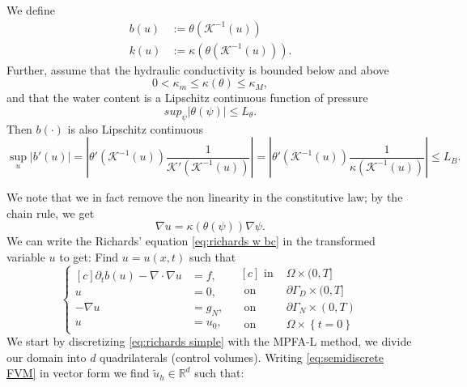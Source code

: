 \documentclass[../Main/main.tex]{subfiles}
\begin{document}
	We define
	\begin{equation}
		\begin{aligned}
			b(u) &:= \theta(\mathcal{K}^{-1}(u))\\
			k(u) &:= \kappa (\theta (\mathcal{K}^{-1}(u))).
		\end{aligned}
	\end{equation}
	Further, assume that the hydraulic conductivity is bounded below and above
	\begin{equation}
		0<\kappa_m \leq \kappa(\theta) \leq \kappa_M,
	\end{equation}
	and that the water content is a Lipschitz continuous function of pressure
	\begin{equation}
		sup_{\psi} |\theta(\psi)|\leq L_{\theta}.
	\end{equation}
	Then $b(\cdot)$ is also Lipschitz continuous
	\begin{equation}
		\sup_{u} |b'(u)| = \left |\theta'(\mathcal{K}^{-1}(u))\frac{1}{\mathcal{K}' (\mathcal{K}^{-1}(u))}\right| = \left  |\theta'(\mathcal{K}^{-1}(u))\frac{1}{\kappa (\mathcal{K}^{-1} (u))}\right|\leq L_B.
	\end{equation}
 	\par
	We note that we in fact remove the non linearity in the constitutive law; by the chain rule, we get
	\begin{equation}
		\nabla u = \kappa(\theta(\psi))\nabla \psi.
	\end{equation}
	We can write the Richards' equation \eqref{eq:richards w bc} in the transformed variable $u$ to get: Find $u=u(x,t)$ such that 
	\begin{equation}\label{eq:richards simple}
	\left \{
	\begin{aligned}[c]
		\partial_t b(u) - \nabla \cdot \nabla u &= f, \\
		u &= 0, \\
		-\nabla u &= g_N,\\
		u &= u_0,
	\end{aligned}
	\ \ \
	\begin{aligned}[c]
		\text{ in }& \Omega \times (0,T]\\
		\text{ on }& \partial \Gamma_D \times (0,T]\\
		\text{ on }& \partial \Gamma_N \times (0,T)\\
		\text{ on }& \Omega \times \left\{t=0\right \}
	\end{aligned}
	\right.
\end{equation}
We start by discretizing \eqref{eq:richards simple} with the MPFA-L method, we divide our domain into $d$ quadrilaterals (control volumes). Writing \eqref{eq:semidiscrete FVM} in vector form we find $\tilde{u}_h \in \mathbb{R}^d$ such that:
\end{document}

